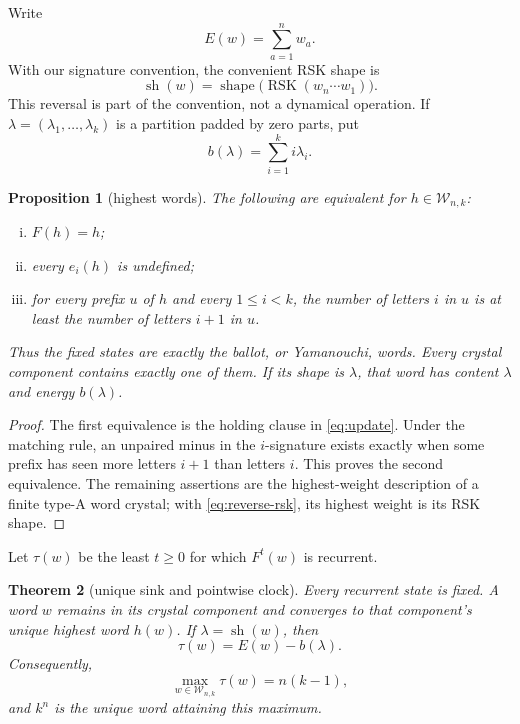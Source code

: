 \documentclass[a4paper,10pt]{amsart}
\newtheorem{theorem}{Theorem}[section]
\newtheorem{proposition}[theorem]{Proposition}
\theoremstyle{remark}
\newcommand{\Words}{\mathcal W}
\newcommand{\sh}{\operatorname{sh}}
\begin{document}
Write
\begin{equation}\label{eq:energy}
 E(w)=\sum_{a=1}^n w_a.
\end{equation}
With our signature convention, the convenient RSK shape is
\begin{equation}\label{eq:reverse-rsk}
 \sh(w)=\operatorname{shape}\bigl(\operatorname{RSK}(w_n\cdots w_1)\bigr).
\end{equation}
This reversal is part of the convention, not a dynamical operation.  If
$\lambda=(\lambda_1,\ldots,\lambda_k)$ is a partition padded by zero parts,
put
\begin{equation}\label{eq:baseline}
 b(\lambda)=\sum_{i=1}^k i\lambda_i.
\end{equation}

\begin{proposition}[highest words]\label{prop:highest}
The following are equivalent for $h\in\Words_{n,k}$:
\begin{enumerate}[(i)]
\item $F(h)=h$;
\item every $e_i(h)$ is undefined;
\item for every prefix $u$ of $h$ and every $1\leq i<k$, the number of
letters $i$ in $u$ is at least the number of letters $i+1$ in $u$.
\end{enumerate}
Thus the fixed states are exactly the ballot, or Yamanouchi, words.
Every crystal component contains exactly one of them.  If its shape is
$\lambda$, that word has content $\lambda$ and energy $b(\lambda)$.
\end{proposition}

\begin{proof}
The first equivalence is the holding clause in \eqref{eq:update}.  Under the
matching rule, an unpaired minus in the $i$-signature exists exactly when
some prefix has seen more letters $i+1$ than letters $i$.  This proves the
second equivalence.  The remaining assertions are the highest-weight
description of a finite type-A word crystal; with \eqref{eq:reverse-rsk}, its
highest weight is its RSK shape.
\end{proof}

Let $\tau(w)$ be the least $t\geq0$ for which $F^t(w)$ is recurrent.

\begin{theorem}[unique sink and pointwise clock]\label{thm:clock}
Every recurrent state is fixed.  A word $w$ remains in its crystal component
and converges to that component's unique highest word $h(w)$.  If
$\lambda=\sh(w)$, then
\begin{equation}\label{eq:clock}
 \tau(w)=E(w)-b(\lambda).
\end{equation}
Consequently,
\begin{equation}\label{eq:sharp-depth}
 \max_{w\in\Words_{n,k}}\tau(w)=n(k-1),
\end{equation}
and $k^n$ is the unique word attaining this maximum.
\end{theorem}
\end{document}
